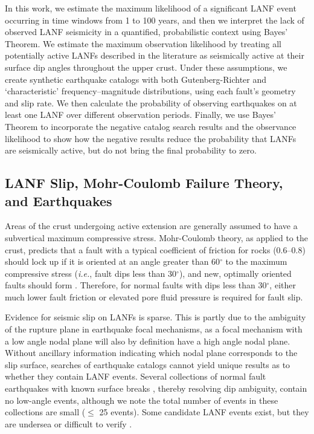 \documentclass[draft,grl]{AGUTeX}
\begin{document}
\begin{article}
In this work, we estimate the maximum likelihood of a significant LANF event
occurring in time windows from 1 to 100 years, and then we interpret the lack
of observed LANF seismicity in a quantified, probabilistic context using
Bayes' Theorem. We estimate the maximum observation likelihood by treating
all potentially active LANFs described in the literature as seismically active
at their surface dip angles throughout the upper crust. Under these
assumptions, we create synthetic earthquake catalogs with both
Gutenberg-Richter and `characteristic' frequency--magnitude distributions,
using each fault's geometry and slip rate.  We then calculate the probability
of observing earthquakes on at least one LANF over different observation
periods. Finally, we use Bayes' Theorem to incorporate the negative catalog
search results and the observance likelihood to show how the negative results
reduce the probability that LANFs are seismically active, but do not bring the
final probability to zero.


\subsection{LANF Slip, Mohr-Coulomb Failure Theory, and Earthquakes}

Areas of the crust undergoing active extension are generally assumed to have
a subvertical maximum compressive stress.  Mohr-Coulomb theory, as applied to
the crust, predicts that a fault with a typical coefficient of friction for
rocks (0.6--0.8) should lock up if it is oriented at an angle greater than
60$^\circ$ to the maximum compressive stress  ({\it i.e.}, fault dips less than
30$^\circ$), and new, optimally oriented faults should form \citep{sibson1985}.
Therefore, for normal faults with dips less than 30$^\circ$, either much lower
fault friction or elevated pore fluid pressure is required for fault slip.

Evidence for seismic slip on LANFs is sparse.  This is partly due to the
ambiguity of the rupture plane in earthquake focal mechanisms, as a focal
mechanism with a low angle nodal plane will also by definition have a high
angle nodal plane.  Without ancillary information indicating which nodal plane
corresponds to the slip surface, searches of earthquake catalogs cannot yield
unique results as to whether they contain LANF events. Several collections of
normal fault earthquakes with known surface breaks \citep{jackson1987,
collettinisibson2001}, thereby resolving dip ambiguity, contain no low-angle
events, although we note the total number of events in these collections are
small ($\le$ 25 events).  Some candidate LANF events exist, but they are
undersea \citep[e.g.,][]{abers2001} or difficult to verify \citep[e.g.,]
[]{doser1987ancash}.



\end{article}
\end{document}
